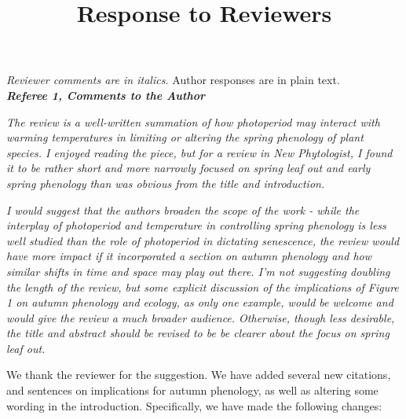 \documentclass{article}
\begin{document}
\setlength\parindent{0pt}

\title{Response to Reviewers}
\emph{Reviewer comments are in italics.} Author responses are in plain text.\\

\emph{{\bf Referee 1, Comments to the Author}}

\par \emph{The review is a well-written summation of how photoperiod may interact with warming temperatures in limiting or altering the spring phenology of plant species. I enjoyed reading the piece, but for a review in New Phytologist, I found it to be rather short and more narrowly focused on spring leaf out and early spring phenology than was obvious from the title and introduction.}

\par \emph{I would suggest that the authors broaden the scope of the work - while the interplay of photoperiod and temperature in controlling spring phenology is less well studied than the role of photoperiod in dictating senescence, the review would have more impact if it incorporated a section on autumn phenology and how similar shifts in time and space may play out there. I'm not suggesting doubling the length of the review, but some explicit discussion of the implications of Figure 1 on autumn phenology and ecology, as only one example, would be welcome and would give the review a much broader audience. Otherwise, though less desirable, the title and abstract should be revised to be be clearer about the focus on spring leaf out.}
\par We thank the reviewer for the suggestion. We have added several new citations, and sentences on implications for autumn phenology, as well as altering some wording in the introduction. Specifically, we have made the following changes:
\end{document}
